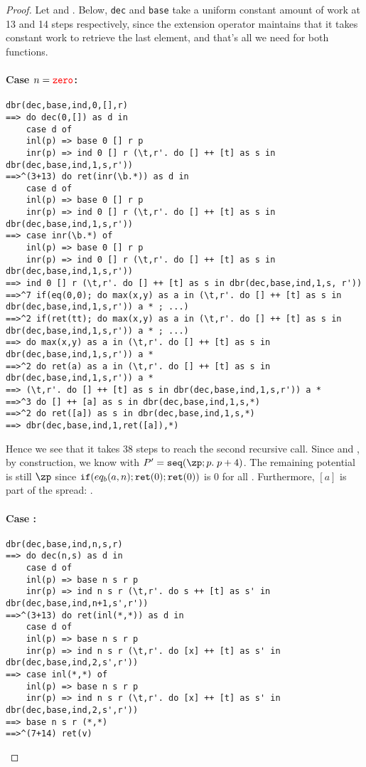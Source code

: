 \begin{proof}
  Let  and . Below, \texttt{dec} and \texttt{base} take a 
  uniform constant amount of work at
13 and 14 steps respectively, since the extension operator maintains that it takes constant work 
to retrieve the last element, and that's all we need for both functions.

\paragraph{\textbf{Case} $n = {\color{red}{\mathtt{zero}}}$:}
\begin{verbatim}
dbr(dec,base,ind,0,[],r) 
==> do dec(0,[]) as d in 
    case d of
    inl(p) => base 0 [] r p 
    inr(p) => ind 0 [] r (\t,r'. do [] ++ [t] as s in dbr(dec,base,ind,1,s,r')) 
==>^(3+13) do ret(inr(\b.*)) as d in 
    case d of
    inl(p) => base 0 [] r p 
    inr(p) => ind 0 [] r (\t,r'. do [] ++ [t] as s in dbr(dec,base,ind,1,s,r')) 
==> case inr(\b.*) of
    inl(p) => base 0 [] r p 
    inr(p) => ind 0 [] r (\t,r'. do [] ++ [t] as s in dbr(dec,base,ind,1,s,r')) 
==> ind 0 [] r (\t,r'. do [] ++ [t] as s in dbr(dec,base,ind,1,s, r')) 
==>^7 if(eq(0,0); do max(x,y) as a in (\t,r'. do [] ++ [t] as s in dbr(dec,base,ind,1,s,r')) a * ; ...)
==>^2 if(ret(tt); do max(x,y) as a in (\t,r'. do [] ++ [t] as s in dbr(dec,base,ind,1,s,r')) a * ; ...)
==> do max(x,y) as a in (\t,r'. do [] ++ [t] as s in dbr(dec,base,ind,1,s,r')) a * 
==>^2 do ret(a) as a in (\t,r'. do [] ++ [t] as s in dbr(dec,base,ind,1,s,r')) a * 
==> (\t,r'. do [] ++ [t] as s in dbr(dec,base,ind,1,s,r')) a * 
==>^3 do [] ++ [a] as s in dbr(dec,base,ind,1,s,*)
==>^2 do ret([a]) as s in dbr(dec,base,ind,1,s,*)
==> dbr(dec,base,ind,1,ret([a]),*)
\end{verbatim}

Hence we see that it takes 38 steps to reach the second recursive call.
Since  and ,
by construction, we know \isVal{[a]}
{} with $P' = \seq{\zp}{p}{p+4}$.
The remaining potential is still $\zp$ since $\mathtt{if}(eq_b(a,n);\mathtt{ret}(0);\mathtt{ret}(0))$ is 0 for all 
  . Furthermore, $[a]$ is part of the spread: 
  .

\paragraph{\textbf{Case} :}
\begin{verbatim}
dbr(dec,base,ind,n,s,r) 
==> do dec(n,s) as d in 
    case d of
    inl(p) => base n s r p 
    inr(p) => ind n s r (\t,r'. do s ++ [t] as s' in dbr(dec,base,ind,n+1,s',r')) 
==>^(3+13) do ret(inl(*,*)) as d in 
    case d of
    inl(p) => base n s r p
    inr(p) => ind n s r (\t,r'. do [x] ++ [t] as s' in dbr(dec,base,ind,2,s',r')) 
==> case inl(*,*) of 
    inl(p) => base n s r p
    inr(p) => ind n s r (\t,r'. do [x] ++ [t] as s' in dbr(dec,base,ind,2,s',r')) 
==> base n s r (*,*)
==>^(7+14) ret(v)
\end{verbatim}


\end{proof}
